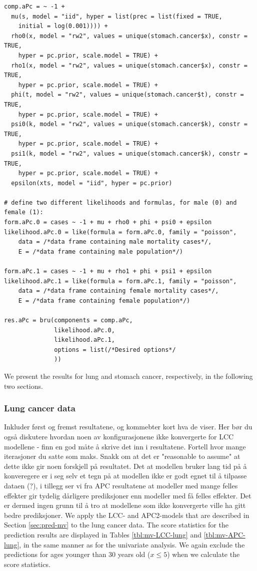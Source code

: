 \begin{verbatim}
comp.aPc = ~ -1 + 
  mu(s, model = "iid", hyper = list(prec = list(fixed = TRUE,
    initial = log(0.001)))) +
  rho0(x, model = "rw2", values = unique(stomach.cancer$x), constr = TRUE,
    hyper = pc.prior, scale.model = TRUE) + 
  rho1(x, model = "rw2", values = unique(stomach.cancer$x), constr = TRUE,
    hyper = pc.prior, scale.model = TRUE) + 
  phi(t, model = "rw2", values = unique(stomach.cancer$t), constr = TRUE,
    hyper = pc.prior, scale.model = TRUE) + 
  psi0(k, model = "rw2", values = unique(stomach.cancer$k), constr = TRUE,
    hyper = pc.prior, scale.model = TRUE) + 
  psi1(k, model = "rw2", values = unique(stomach.cancer$k), constr = TRUE,
    hyper = pc.prior, scale.model = TRUE) + 
  epsilon(xts, model = "iid", hyper = pc.prior)

# define two different likelihoods and formulas, for male (0) and female (1):
form.aPc.0 = cases ~ -1 + mu + rho0 + phi + psi0 + epsilon
likelihood.aPc.0 = like(formula = form.aPc.0, family = "poisson",
    data = /*data frame containing male mortality cases*/,
    E = /*data frame containing male population*/)

form.aPc.1 = cases ~ -1 + mu + rho1 + phi + psi1 + epsilon
likelihood.aPc.1 = like(formula = form.aPc.1, family = "poisson",
    data = /*data frame containing female mortality cases*/,
    E = /*data frame containing female population*/)

res.aPc = bru(components = comp.aPc,
              likelihood.aPc.0,
              likelihood.aPc.1,
              options = list(/*Desired options*/
              )) 
\end{verbatim}
\newpar We present the results for lung and stomach cancer, respectively, in the following two sections.

\subsubsection{Lung cancer data}
\textcolor{myDarkGreen}{
Inkluder først og fremst resultatene, og kommebter kort hva de viser. Her bør du også diskutere hvordan noen av konfigurasjonene ikke konvergerte for LCC modellene - finn en god måte å skrive det inn i resultatene. Fortell hvor mange iterasjoner du satte som maks. Snakk om at det er "reasonable to assume" at dette ikke gir noen forskjell på resultatet. Det at modellen bruker lang tid på å konveregere er i seg selv et tegn på at modellen ikke er godt egnet til å tilpasse dataen (?), i tillegg ser vi fra APC resultatene at modeller med mange felles effekter gir tydelig dårligere prediksjoner enn modeller med få felles effekter. Det er dermed ingen grunn til å tro at modellene som ikke konvergerte ville ha gitt bedre prediksjoner. 
}
We apply the LCC- and APC2-models that are described in Section \ref{sec:pred-mv} to the lung cancer data. The score statistics for the prediction results are displayed in Tables \ref{tbl:mv-LCC-lung} and \ref{tbl:mv-APC-lung}, in the same manner as for the univariate analysis. We again exclude the predictions for ages younger than 30 years old ($x \leq 5$) when we calculate the score statistics. 

